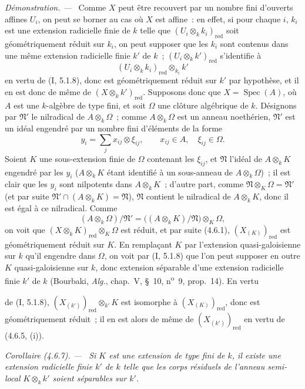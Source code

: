 \documentclass[10pt,oneside]{book}
\newcommand{\oldpage}[2][]{%
  \setcounter{footnote}{0}%
  \marginpar{\scriptsize\textbf{#1}~|~#2}\ignorespaces}
\newenvironment{corollary}[1][]{%
  \par\medskip\noindent\itshape Corollaire (#1). ---\ }{\par}
\newenvironment{proof}{%
  \par\medskip\noindent\textit{Démonstration. ---\ }}{\par}
\begin{document}
\begin{proof}
Comme $X$ peut être recouvert par un nombre fini d'ouverts affines $U_i$, on
peut se borner au cas où $X$ est affine~: en effet, si pour chaque $i$, $k_i$
est une extension radicielle finie de $k$ telle que
$(U_i\otimes_k k_i)_{\mathrm{red}}$ soit géométriquement réduit sur $k_i$, on
peut supposer que les $k_i$ sont contenus dans une même extension radicielle
finie $k'$ de $k$~; $(U_i\otimes_k k')_{\mathrm{red}}$ s'identifie à
\[
(U_i\otimes_k k_i)_{\mathrm{red}}\otimes_{k_i}k'
\]
en vertu de (I, 5.1.8), donc est géométriquement réduit sur $k'$ par hypothèse,
et il en est donc de même de $(X\otimes_k k')_{\mathrm{red}}$. Supposons donc
que $X=\operatorname{Spec}(A)$, où $A$ est une $k$-algèbre de type fini, et
soit $\Omega$ une clôture algébrique de $k$. Désignons par $\mathfrak N'$ le
nilradical de $A\otimes_k\Omega$~; comme $A\otimes_k\Omega$ est un anneau
noethérien, $\mathfrak N'$ est un idéal engendré par un nombre fini d'éléments
de la forme
\[
y_i=\sum_j x_{ij}\otimes\xi_{ij},
\qquad x_{ij}\in A,\quad \xi_{ij}\in\Omega.
\]
Soient $K$ une sous-extension finie de $\Omega$ contenant les $\xi_{ij}$, et
$\mathfrak N$ l'idéal de $A\otimes_k K$ engendré par les $y_i$
($A\otimes_k K$ étant identifié à un sous-anneau de $A\otimes_k\Omega$)~; il
est clair que les $y_i$ sont nilpotents dans $A\otimes_k K$~; d'autre part,
comme $\mathfrak N\otimes_K\Omega=\mathfrak N'$ (et par suite
$\mathfrak N'\cap(A\otimes_k K)=\mathfrak N$), $\mathfrak N$ contient le
nilradical de $A\otimes_k K$, donc il est égal à ce nilradical. Comme
\[
(A\otimes_k\Omega)/\mathfrak N'
=\bigl((A\otimes_k K)/\mathfrak N\bigr)\otimes_K\Omega,
\]
on voit que $(X\otimes_k K)_{\mathrm{red}}\otimes_K\Omega$ est réduit, et par
suite (4.6.1), $(X_{(K)})_{\mathrm{red}}$ est géométriquement réduit sur $K$.
En remplaçant $K$ par l'extension quasi-galoisienne sur $k$ qu'il engendre dans
$\Omega$, on voit par (I, 5.1.8) que l'on peut supposer en outre $K$
quasi-galoisienne sur $k$, donc extension séparable d'une extension radicielle
finie $k'$ de $k$ (Bourbaki, \emph{Alg.}, chap.~V, \S~10,
n\textsuperscript{o}~9, prop.~14). En vertu

\oldpage[IV-2]{70}

de (I, 5.1.8), $(X_{(k')})_{\mathrm{red}}\otimes_{k'}K$ est isomorphe à
$(X_{(K)})_{\mathrm{red}}$, donc est géométriquement réduit~; il en est alors de
même de $(X_{(k')})_{\mathrm{red}}$ en vertu de (4.6.5, (i)).
\end{proof}

\begin{corollary}[4.6.7]
\label{IV.2.4.6.7-fr}
Si $K$ est une extension de type fini de $k$, il existe une extension radicielle
finie $k'$ de $k$ telle que les corps résiduels de l'anneau semi-local
$K\otimes_k k'$ soient séparables sur $k'$.
\end{corollary}
\end{document}

